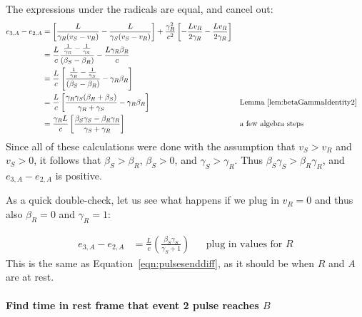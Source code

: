 \documentclass[a4paper]{article}
\theoremstyle{plain}
\theoremstyle{definition}
\begin{document}
The expressions under the radicals are equal, and cancel out:
\begin{align}
e_{3,A}-e_{2,A}
  & = \left[ \frac{L}{\gamma_R(v_S - v_R)} - \frac{L}{\gamma_S(v_S - v_R)} \right] + \frac{\gamma_R^2}{c^2} \left[ -\frac{Lv_R}{2\gamma_R} - \frac{Lv_R}{2\gamma_R} \right] \nonumber \\
  & = \frac{L}{c} \frac{\frac{1}{\gamma_R} - \frac{1}{\gamma_S}}{(\beta_S - \beta_R)} - \frac{L\gamma_R\beta_R}{c} \nonumber \\
  & = \frac{L}{c} \left[ \frac{\frac{1}{\gamma_R} - \frac{1}{\gamma_S}}{(\beta_S - \beta_R)} - \gamma_R\beta_R \right] \label{eqn:scen2b-observerA-step1} \\
  & = \frac{L}{c} \left[ \frac{\gamma_R\gamma_S(\beta_R+\beta_S)}{\gamma_R+\gamma_S} - \gamma_R\beta_R \right] & & \text{Lemma~\ref{lem:betaGammaIdentity2}} \nonumber \\
  & = \frac{\gamma_R L}{c} \left[ \frac{\beta_S\gamma_S - \beta_R\gamma_R}{\gamma_S + \gamma_R} \right] & & \text{a few algebra steps} \label{eqn:scen2b-observerA-finalstep}
\end{align}
Since all of these calculations were done with the assumption that
$v_S > v_R$ and $v_S > 0$, it follows that $\beta_S > \beta_R$,
$\beta_S > 0$, and $\gamma_S > \gamma_R$.  Thus
$\beta_S\gamma_S > \beta_R\gamma_R$, and $e_{3,A}-e_{2,A}$ is positive.

As a quick double-check, let us see what happens if we plug in $v_R=0$
and thus also $\beta_R=0$ and $\gamma_R=1$:

\begin{align*}
e_{3,A}-e_{2,A}
  & = \frac{L}{c} \left( \frac{\beta_S\gamma_S}{\gamma_S + 1} \right) & & \text{plug in values for $R$}
\end{align*}
This is the same as Equation~\eqref{eqn:pulsesenddiff}, as it should
be when $R$ and $A$ are at rest.


\paragraph{Find time in rest frame that event 2 pulse reaches $B$}
\end{document}
